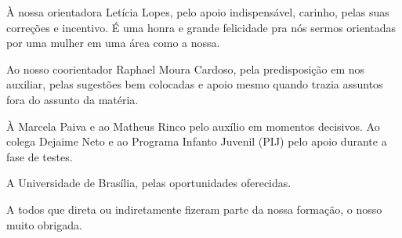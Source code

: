 À nossa orientadora Letícia Lopes, pelo apoio indispensável, carinho, pelas suas correções e incentivo. É uma honra e grande felicidade pra nós sermos orientadas por uma mulher em uma área como a nossa.

Ao nosso coorientador Raphael Moura Cardoso, pela predisposição em nos auxiliar, pelas sugestões bem colocadas e apoio mesmo quando trazia assuntos fora do assunto da matéria.

À Marcela Paiva e ao Matheus Rinco pelo auxílio em momentos decisivos. Ao colega Dejaime Neto e ao Programa Infanto Juvenil (PIJ) pelo apoio durante a fase de testes.

A Universidade de Brasília, pelas oportunidades oferecidas.

A todos que direta ou indiretamente fizeram parte da nossa formação, o nosso muito obrigada.